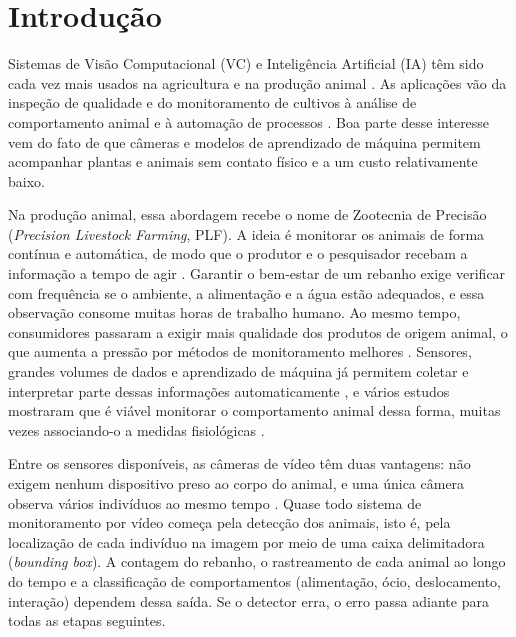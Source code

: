 %
%
%
\chapter{Introdução}
\label{cap:introducao}

Sistemas de Visão Computacional (VC) e Inteligência Artificial (IA) têm sido cada vez mais usados na agricultura e na produção animal \cite{kamilaris2018deep}. As aplicações vão da inspeção de qualidade \cite{industrial_quality_cv_2024} e do monitoramento de cultivos \cite{vit_precision_agriculture_2025} à análise de comportamento animal \cite{animalformer_2024} e à automação de processos \cite{kang2025bokchoy_cv_iot}. Boa parte desse interesse vem do fato de que câmeras e modelos de aprendizado de máquina permitem acompanhar plantas e animais sem contato físico e a um custo relativamente baixo.

Na produção animal, essa abordagem recebe o nome de Zootecnia de Precisão (\textit{Precision Livestock Farming}, PLF). A ideia é monitorar os animais de forma contínua e automática, de modo que o produtor e o pesquisador recebam a informação a tempo de agir \cite{berckmans2014plf}. Garantir o bem-estar de um rebanho exige verificar com frequência se o ambiente, a alimentação e a água estão adequados, e essa observação consome muitas horas de trabalho humano. Ao mesmo tempo, consumidores passaram a exigir mais qualidade dos produtos de origem animal, o que aumenta a pressão por métodos de monitoramento melhores \cite{dominiak2019, nasirahmadi2017, halachmi2019}. Sensores, grandes volumes de dados e aprendizado de máquina já permitem coletar e interpretar parte dessas informações automaticamente \cite{neethirajan2020sensors}, e vários estudos mostraram que é viável monitorar o comportamento animal dessa forma, muitas vezes associando-o a medidas fisiológicas \cite{halachmi2019, fogarty2018, rohan2023deep_livestock_survey}.

Entre os sensores disponíveis, as câmeras de vídeo têm duas vantagens: não exigem nenhum dispositivo preso ao corpo do animal, e uma única câmera observa vários indivíduos ao mesmo tempo \cite{nasirahmadi2017}. Quase todo sistema de monitoramento por vídeo começa pela detecção dos animais, isto é, pela localização de cada indivíduo na imagem por meio de uma caixa delimitadora (\textit{bounding box}). A contagem do rebanho, o rastreamento de cada animal ao longo do tempo e a classificação de comportamentos (alimentação, ócio, deslocamento, interação) dependem dessa saída. Se o detector erra, o erro passa adiante para todas as etapas seguintes.

